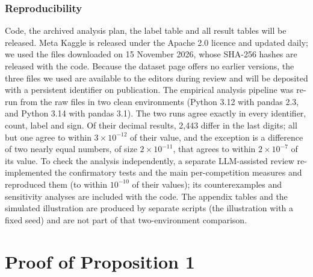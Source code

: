 \documentclass[10pt]{article}
\begin{document}
\subsubsection*{Reproducibility}
Code, the archived analysis plan, the label table and all result tables will be released. Meta Kaggle is released under the Apache 2.0 licence and updated daily; we used the files downloaded on 15 November 2026, whose SHA-256 hashes are released with the code. Because the dataset page offers no earlier versions, the three files we used are available to the editors during review and will be deposited with a persistent identifier on publication. The empirical analysis pipeline was re-run from the raw files in two clean environments (Python 3.12 with pandas 2.3, and Python 3.14 with pandas 3.1). The two runs agree exactly in every identifier, count, label and sign. Of their decimal results, 2,443 differ in the last digits; all but one agree to within $3\times10^{-12}$ of their value, and the exception is a difference of two nearly equal numbers, of size $2\times10^{-11}$, that agrees to within $2\times10^{-7}$ of its value. To check the analysis independently, a separate LLM-assisted review re-implemented the confirmatory tests and the main per-competition measures and reproduced them (to within $10^{-10}$ of their values); its counterexamples and sensitivity analyses are included with the code. The appendix tables and the simulated illustration are produced by separate scripts (the illustration with a fixed seed) and are not part of that two-environment comparison.




\appendix


\section{Proof of Proposition 1}
\label{app:prop}
\end{document}
